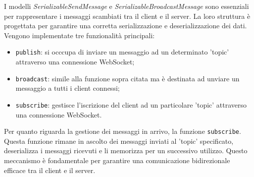I modelli \textit{SerializableSendMessage} e \textit{SerializableBroadcastMessage} sono essenziali per rappresentare i messaggi scambiati tra il client e
il server. La loro struttura è progettata per garantire una corretta serializzazione e deserializzazione dei dati. \\

Vengono implementate tre funzionalità principali:
\begin{itemize}
    \item \texttt{publish}: si occcupa di inviare un messaggio ad un determinato 'topic' attraverso una connessione WebSocket;
    \item \texttt{broadcast}: simile alla funzione sopra citata ma è destinata ad unviare un messaggio a tutti i client connessi;
    \item \texttt{subscribe}: gestisce l'iscrizione del client ad un particolare 'topic' attraverso una connessione WebSocket.
\end{itemize}

Per quanto riguarda la gestione dei messaggi in arrivo, la funzione \texttt{subscribe}.
Questa funzione rimane in ascolto dei messaggi inviati al 'topic' specificato, deserializza i messaggi ricevuti e li memorizza per un successivo utilizzo.
Questo meccanismo è fondamentale per garantire una comunicazione bidirezionale efficace tra il client e il server.

